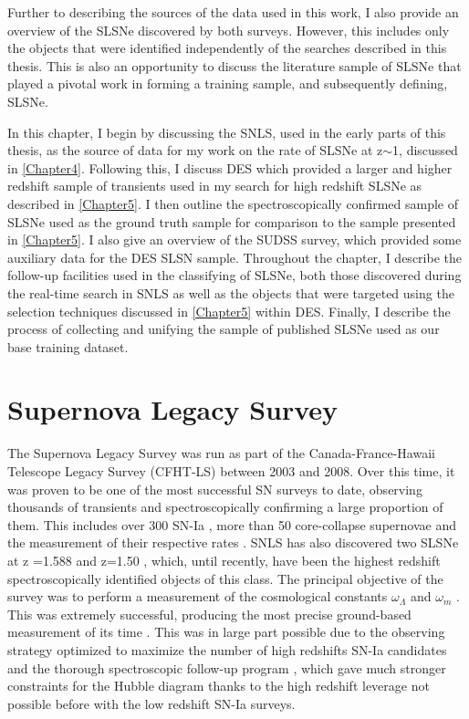 Further to describing the sources of the data used in this work, I also provide an overview of the SLSNe discovered by both surveys. However, this includes only the objects that were identified independently of the searches described in this thesis. This is also an opportunity to discuss the literature sample of SLSNe that played a pivotal work in forming a training sample, and subsequently defining, SLSNe.

In this chapter, I begin by discussing the SNLS, used in the early parts of this thesis, as the source of data for my work on the rate of SLSNe at z$\sim$1, discussed in \cref{Chapter4}. Following this, I discuss DES which provided a larger and higher redshift sample of transients used in my search for high redshift SLSNe as described in \cref{Chapter5}. I then outline the spectroscopically confirmed sample of SLSNe used as the ground truth sample for comparison to the sample presented in \cref{Chapter5}. I also give an overview of the SUDSS survey, which provided some auxiliary data for the DES SLSN sample. Throughout the chapter, I describe the follow-up facilities used in the classifying of SLSNe, both those discovered during the real-time search in SNLS as well as the objects that were targeted using the selection techniques discussed in \cref{Chapter5} within DES. Finally, I describe the process of collecting and unifying the sample of published SLSNe used as our base training dataset.

\section{Supernova Legacy Survey}
The Supernova Legacy Survey \citep{Boulade2003,Pritchet2004} was run as part of the Canada-France-Hawaii Telescope Legacy Survey (CFHT-LS) between 2003 and 2008. Over this time, it was proven to be one of the most successful SN surveys to date, observing thousands of transients and spectroscopically confirming a large proportion of them. This includes over 300 SN-Ia \citep{Perrett2010}, more than 50 core-collapse supernovae and the measurement of their respective rates \citep{Perrett2012,Bazin2009}. SNLS has also discovered two SLSNe at z =1.588 and z=1.50 \citep{Howell2013}, which, until recently, have been the highest redshift spectroscopically identified objects of this class. The principal objective of the survey was to perform a measurement of the cosmological constants $\omega_{\Lambda}$ and $\omega_{m}$ \citep{Astier2006}. This was extremely successful, producing the most precise ground-based measurement of its time \citep{Sullivan2011}. This was in large part possible due to the observing strategy optimized to maximize the number of high redshifts SN-Ia candidates and the thorough spectroscopic follow-up program \citep{Bronder2007}, which gave much stronger constraints for the Hubble diagram thanks to the high redshift leverage not possible before with the low redshift SN-Ia surveys.

